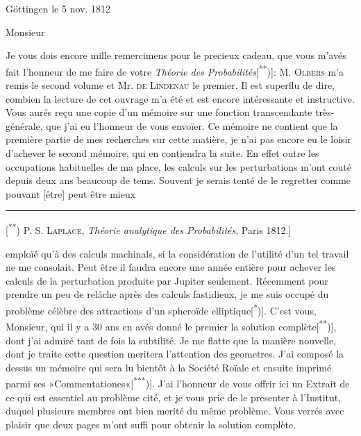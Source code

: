 \begin{flushright}Göttingen le 5 nov. 1812\end{flushright}
\noindent\hspace*{.27\linewidth}Monsieur

\indent Je vous dois encore mille remercimens pour le precieux cadeau, que vous m’avés fait l’honneur de me faire de votre \textit{Théorie des Probabilités}[\textsuperscript{**})]: M. \textsc{Olbers} m’a remis le second volume et Mr. \textsc{de Lindenau} le premier. Il est superflu de dire, combien la lecture de cet ouvrage m’a été et est encore intéressante et instructive. Vous aurés reçu une copie d’un mémoire sur une fonction transcendante très-générale, que j’ai eu l’honneur de vous envoïer. Ce mémoire ne contient que la première partie de mes recherches sur cette matière, je n’ai pas encore eu le loisir d’achever le second mémoire, qui en contiendra la suite. En effet outre les occupations habituelles de ma place, les calculs sur les perturbations m’ont couté depuis deux ans beaucoup de tems. Souvent je serais tenté de le regretter comme pouvant [être] peut être mieux
\par\medskip\noindent\rule{.24\linewidth}{.4pt}\par\smallskip
{\small
\noindent\hspace*{\parindent}[\textsuperscript{**}) P. S. \textsc{Laplace}, \textit{Théorie analytique des Probabilités}, Paris 1812.]
\par}
\clearpage{}
\noindent emploïé qu’à des calculs machinals, si la considération de l’utilité d’un tel travail ne me consolait. Peut être il faudra encore une année entière pour achever les calculs de la perturbation produite par Jupiter seulement. Récemment pour prendre un peu de relâche après des calculs fastidieux, je me suis occupé du problème célèbre des attractions d’un spheroïde elliptique[\textsuperscript{*})]. C’est vous, Monsieur, qui il y a 30 ans en avés donné le premier la solution complète[\textsuperscript{**})], dont j’ai admiré tant de fois la subtilité. Je me flatte que la manière nouvelle, dont je traite cette question meritera l’attention des geometres. J’ai composé la dessus un mémoire qui sera lu bientôt à la Société Roïale et ensuite imprimé parmi ses »Commentationes«[\textsuperscript{***})]. J’ai l’honneur de vous offrir ici un Extrait de ce qui est essentiel au problème cité, et je vous prie de le presenter à l’Institut, duquel plusieurs membres ont bien merité du même problème. Vous verrés avec plaisir que deux pages m’ont suffi pour obtenir la solution complète.

